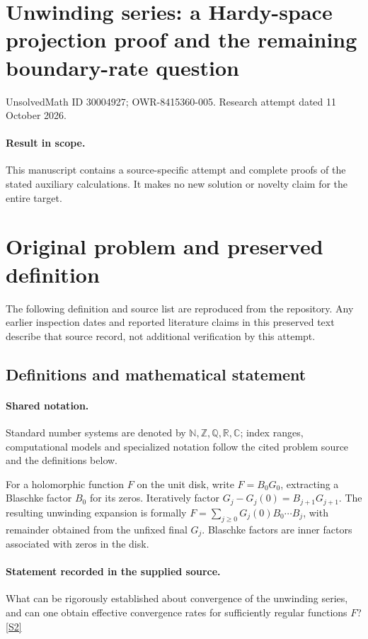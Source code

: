 \documentclass[11pt]{article}
\begin{document}
\section*{Unwinding series: a Hardy-space projection proof and the remaining boundary-rate question}
\noindent UnsolvedMath ID 30004927; OWR-8415360-005. Research attempt dated 11 October 2026.
\paragraph{Result in scope.}This manuscript contains a source-specific attempt and complete proofs of the stated auxiliary calculations. It makes no new solution or novelty claim for the entire target.
\section{Original problem and preserved definition}
The following definition and source list are reproduced from the repository. Any earlier inspection dates and reported literature claims in this preserved text describe that source record, not additional verification by this attempt.
\subsection{Definitions and mathematical statement}

\paragraph{Shared notation.}Standard number systems are denoted by $\mathbb N,\mathbb Z,\mathbb Q,\mathbb R,\mathbb C$; index ranges, computational models and specialized notation follow the cited problem source and the definitions below.


For a holomorphic function $F$ on the unit disk, write $F=B_0G_0$, extracting a Blaschke factor $B_0$ for its zeros. Iteratively factor $G_j-G_j(0)=B_{j+1}G_{j+1}$. The resulting unwinding expansion is formally $F=\sum_{j\geq0}G_j(0)B_0\cdots B_j$, with remainder obtained from the unfixed final $G_j$. Blaschke factors are inner factors associated with zeros in the disk.
\paragraph{Statement recorded in the supplied source.}
What can be rigorously established about convergence of the unwinding series, and can one obtain effective convergence rates for sufficiently regular functions $F$? \href{https://doi.org/10.4171/owr/2021/55}{[S2]}
\end{document}
